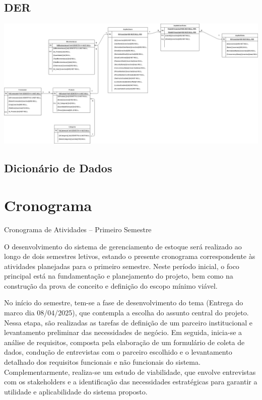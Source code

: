 \documentclass[
	12pt,				%
	openright,			%
	twoside,			%
	a4paper,			%
	english,			%
	french,				%
	spanish,			%
	brazil				%
	]{abntex2}
\begin{document}
\subsection{DER}

\includegraphics[width=1.0\textwidth]{Figuras/DERestoque.png}



\subsection{Dicionário de Dados}

\section{Cronograma}

Cronograma de Atividades – Primeiro Semestre

O desenvolvimento do sistema de gerenciamento de estoque será realizado ao longo de dois semestres letivos, estando o presente cronograma correspondente às atividades planejadas para o primeiro semestre. Neste período inicial, o foco principal está na fundamentação e planejamento do projeto, bem como na construção da prova de conceito e definição do escopo mínimo viável.

No início do semestre, tem-se a fase de desenvolvimento do tema (Entrega do marco dia 08/04/2025), que contempla a escolha do assunto central do projeto. Nessa etapa, são realizadas as tarefas de definição de um parceiro institucional e levantamento preliminar das necessidades de negócio. Em seguida, inicia-se a análise de requisitos, composta pela elaboração de um formulário de coleta de dados, condução de entrevistas com o parceiro escolhido e o levantamento detalhado dos requisitos funcionais e não funcionais do sistema. Complementarmente, realiza-se um estudo de viabilidade, que envolve entrevistas com os stakeholders e a identificação das necessidades estratégicas para garantir a utilidade e aplicabilidade do sistema proposto.
\end{document}
